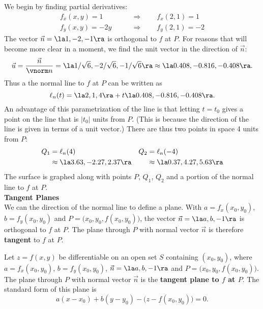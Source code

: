 {We begin by finding partial derivatives:
\begin{align*}
f_x(x,y)  =1  \qquad &\Rightarrow \qquad f_x(2,1) = 1\\
f_y(x,y) = -2y \qquad &\Rightarrow \qquad  f_y(2,1) = -2
\end{align*}
The vector $\vec n=\la 1,-2,-1\ra$ is orthogonal to $f$ at $P$. For reasons that will become more clear in a moment, we find the unit vector in the direction of $\vec n$:
$$\vec u = \frac{\vec n}{\vnorm n} = \la 1/\sqrt{6},-2/\sqrt{6},-1/\sqrt{6}\ra \approx \la 0.408,-0.816,-0.408\ra.$$
Thus a the normal line to $f$ at $P$ can be written as
$$\ell_n(t) = \la 2,1,4\ra + t\la  0.408,-0.816,-0.408 \ra.$$
An advantage of this parametrization of the line is that letting $t=t_0$ gives a point on the line that is $|t_0|$ units from $P$. (This is because the direction of the line is given in terms of a unit vector.) There are thus two points in space 4 units from $P$:
\begin{align*}
Q_1 &= \ell_n(4) & Q_2 &= \ell_n(-4) \\
  &\approx \la 3.63, -2.27, 2.37\ra & & \approx\la 0.37, 4.27, 5.63\ra
	\end{align*}
The surface is graphed along with points $P$, $Q_1$, $Q_2$ and a portion of the normal line to $f$ at $P$.
}\\

\noindent\textbf{\large Tangent Planes}\\

We can the direction of the normal line to define a plane. With $a=f_x(x_0,y_0)$, $b=f_y(x_0,y_0)$ and $P = \big(x_0,y_0,f(x_0,y_0)\big)$, the vector $\vec n=\la a,b,-1\ra$ is orthogonal to $f$ at $P$. The plane through $P$ with normal vector $\vec n$ is therefore \textbf{tangent} to $f$ at $P$.

{Let $z=f(x,y)$ be differentiable on an open set $S$ containing $(x_0,y_0)$, where
$a = f_x(x_0,y_0)$, $b=f_y(x_0,y_0)$, $\vec n= \la a,b,-1\ra$ and $P=\big(x_0,y_0,f(x_0,y_0)\big)$.\\

The plane through $P$ with normal vector $\vec n$ is the \textbf{tangent plane to $f$ at $P$}. The standard form of this plane is 
$$a(x-x_0) + b(y-y_0) - \big(z-f(x_0,y_0)\big) = 0.$$
}

